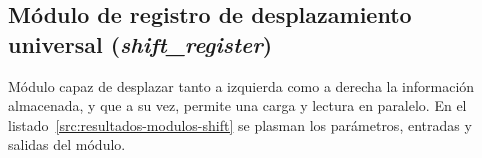 

\subsection{Módulo de registro de desplazamiento universal (\emph{shift\_register})}
Módulo capaz de desplazar tanto a izquierda como a derecha la información almacenada, y que a su vez, permite una carga y lectura en paralelo. En el listado~\ref{src:resultados-modulos-shift} se plasman los parámetros, entradas y salidas del módulo.

